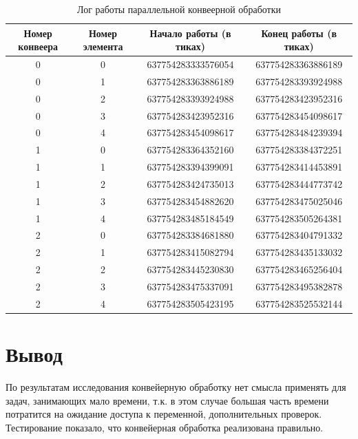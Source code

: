 \documentclass[12pt]{report}
\begin{document}
\begin{table}[H]
	\caption{Лог работы параллельной конвеерной обработки}
	\begin{center}
		
		\begin{tabular}{|c|c|c|c|}
			\hline
			Номер конвеера & Номер элемента  & Начало работы (в тиках) & Конец работы (в тиках)\\
			\hline
			
			0 & 0 & 637754283333576054 & 637754283363886189\\
			0 & 1 & 637754283363886189 & 637754283393924988\\
			0 & 2 & 637754283393924988 & 637754283423952316\\
			0 & 3 & 637754283423952316 & 637754283454098617\\
			0 & 4 & 637754283454098617 & 637754283484239394\\
			\hline
			
			1 & 0 & 637754283364352160 & 637754283384372251\\
			1 & 1 & 637754283394399091 & 637754283414453891\\
			1 & 2 & 637754283424735013 & 637754283444773742\\
			1 & 3 & 637754283454882620 & 637754283475025046\\
			1 & 4 & 637754283485184549 & 637754283505264381\\
			\hline
			
			2 & 0 & 637754283384681880 & 637754283404791332\\
			2 & 1 & 637754283415082794 & 637754283435133032\\
			2 & 2 & 637754283445230830 & 637754283465256404\\
			2 & 3 & 637754283475337091 & 637754283495382878\\
			2 & 4 & 637754283505423195 & 637754283525532144\\
			
			\hline
		\end{tabular}
	\end{center}
\end{table}

\section*{Вывод}
По результатам исследования конвейерную обработку нет смысла применять для задач, занимающих мало времени, т.к. в этом случае большая часть времени потратится на ожидание доступа к переменной, дополнительных проверок.
Тестирование показало, что конвейерная обработка реализована правильно.
\end{document}
